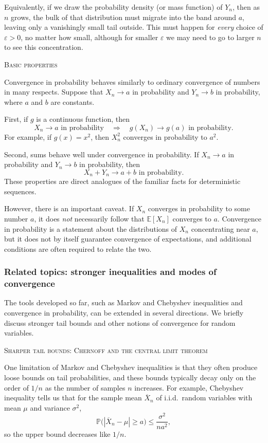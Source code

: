 Equivalently, if we draw the probability density (or mass function) of \(Y_n\), then as \(n\) grows, the bulk of that distribution must migrate into the band around \(a\), leaving only a vanishingly small tail outside.  
This must happen for \textit{every} choice of \(\varepsilon > 0\), no matter how small, although for smaller \(\varepsilon\) we may need to go to larger \(n\) to see this concentration.  

\bigskip
\textsc{Basic properties}

Convergence in probability behaves similarly to ordinary convergence of numbers in many respects.  
Suppose that \(X_n \to a\) in probability and \(Y_n \to b\) in probability, where \(a\) and \(b\) are constants.  

First, if \(g\) is a continuous function, then
\[
X_n \to a \text{ in probability}
\quad\Longrightarrow\quad
g(X_n) \to g(a) \text{ in probability}.
\]
For example, if \(g(x) = x^{2}\), then \(X_n^{2}\) converges in probability to \(a^{2}\).  

Second, sums behave well under convergence in probability.  
If \(X_n \to a\) in probability and \(Y_n \to b\) in probability, then
\[
X_n + Y_n \to a + b \text{ in probability}.
\]
These properties are direct analogues of the familiar facts for deterministic sequences.  

However, there is an important caveat.  
If \(X_n\) converges in probability to some number \(a\), it does \textit{not} necessarily follow that \(\mathbb{E}[X_n]\) converges to \(a\).  
Convergence in probability is a statement about the distributions of \(X_n\) concentrating near \(a\), but it does not by itself guarantee convergence of expectations, and additional conditions are often required to relate the two.

\subsubsection{Related topics: stronger inequalities and modes of convergence}

The tools developed so far, such as Markov and Chebyshev inequalities and convergence in probability, can be extended in several directions.  
We briefly discuss stronger tail bounds and other notions of convergence for random variables.  

\bigskip
\textsc{Sharper tail bounds: Chernoff and the central limit theorem}

One limitation of Markov and Chebyshev inequalities is that they often produce loose bounds on tail probabilities, and these bounds typically decay only on the order of \(1/n\) as the number of samples \(n\) increases.  
For example, Chebyshev inequality tells us that for the sample mean \(\overline{X}_n\) of i.i.d.\ random variables with mean \(\mu\) and variance \(\sigma^{2}\),
\[
\mathbb{P}\big(|\overline{X}_n - \mu| \ge a\big)
\le
\frac{\sigma^{2}}{n a^{2}},
\]
so the upper bound decreases like \(1/n\).  

